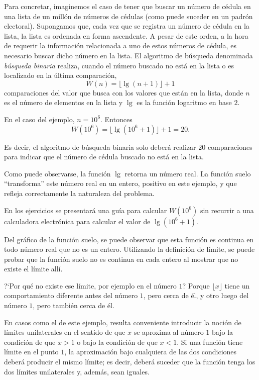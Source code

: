Para concretar, imaginemos el caso de tener que buscar un número de cédula en una lista de un
millón de números de cédulas (como puede suceder en un padrón electoral). Supongamos que, cada vez
que se registra un número de cédula en la lista, la lista es ordenada en forma ascendente. A pesar
de este orden, a la hora de requerir la información relacionada a uno de estos números de cédula,
es necesario buscar dicho número en la lista. El algoritmo de búsqueda denominada \emph{búsqueda
binaria} realiza, cuando el número buscado no está en la lista o es localizado en la última
comparación,
\[
W(n) = \lfloor \lg(n + 1) \rfloor + 1
\]
comparaciones del valor que busca con los valores que están en la lista, donde $n$ es el número de
elementos en la lista y $\lg$ es la función logaritmo en base $2$.

En el caso del ejemplo, $n = 10^6$. Entonces
\[
W(10^6) = \lfloor \lg(10^6 + 1) \rfloor + 1 = 20.
\]

Es decir, el algoritmo de búsqueda binaria solo deberá realizar $20$ comparaciones para indicar que
el número de cédula buscado no está en la lista.

Como puede observarse, la función $\lg$ retorna un número real. La función suelo ``transforma''
este número real en un entero, positivo en este ejemplo, y que refleja correctamente la naturaleza
del problema.

En los ejercicios se presentará una guía para calcular $W(10^6)$ sin recurrir a una calculadora
electrónica para calcular el valor de $\lg(10^6 + 1)$.

Del gráfico de la función suelo, se puede observar que esta función es continua en todo número real
que no es un entero. Utilizando la definición de límite, se puede probar que la función suelo no es
continua en cada entero al mostrar que no existe el límite allí.

?`Por qué no existe ese límite, por ejemplo en el número $1$? Porque $\lfloor x \rfloor$ tiene un
comportamiento diferente antes del número $1$, pero cerca de él, y otro luego del número $1$, pero
también cerca de él.

En casos como el de este ejemplo, resulta conveniente introducir la noción de límites unilaterales
en el sentido de que $x$ se aproxima al número $1$ bajo la condición de que $x > 1$ o bajo la
condición de que $x < 1$. Si una función tiene límite en el punto $1$, la aproximación bajo
cualquiera de las dos condiciones deberá producir el mismo límite; es decir, deberá suceder que la
función tenga los dos límites unilaterales y, además, sean iguales.

